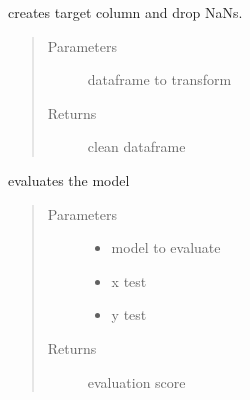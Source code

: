 \documentclass[letterpaper,10pt,english]{sphinxmanual}
\begin{document}

\begin{fulllineitems}
\label{\detokenize{algorithms:algorithms.isg.isg_trainer.__transform_df}}
\sphinxAtStartPar
creates target column and drop NaNs.
\begin{quote}\begin{description}
\item[{Parameters}] \leavevmode
\sphinxAtStartPar
{} \textendash{} dataframe to transform

\item[{Returns}] \leavevmode
\sphinxAtStartPar
clean dataframe

\end{description}\end{quote}

\end{fulllineitems}


\begin{fulllineitems}
\label{\detokenize{algorithms:algorithms.isg.isg_trainer.do_test}}
\sphinxAtStartPar
evaluates the model
\begin{quote}\begin{description}
\item[{Parameters}] \leavevmode\begin{itemize}
\item {} 
\sphinxAtStartPar
{} \textendash{} model to evaluate

\item {} 
\sphinxAtStartPar
{} \textendash{} x test

\item {} 
\sphinxAtStartPar
{} \textendash{} y test

\end{itemize}

\item[{Returns}] \leavevmode
\sphinxAtStartPar
evaluation score

\end{description}\end{quote}

\end{fulllineitems}
\end{document}
